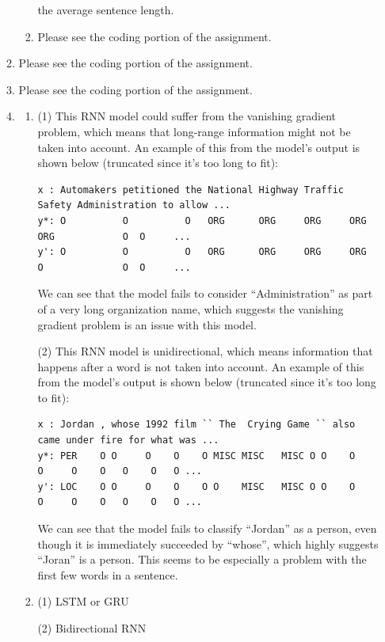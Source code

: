 \documentclass[10pt,reqno]{amsart}
\begin{document}
\begin{enumerate}[topsep=0pt,itemsep=3ex,partopsep=1ex,parsep=1ex]
\begin{enumerate}[itemsep=2ex]
\begin{enumerate}[itemsep=2ex]
        the average sentence length. 
      \item Please see the coding portion of the assignment.
    \end{enumerate}
  \item Please see the coding portion of the assignment.
  \item Please see the coding portion of the assignment.
  \item 
    \begin{enumerate}[itemsep=2ex]
      \item 
        (1) This RNN model could suffer from the vanishing gradient problem, which means that long-range information 
        might not be taken into account. An example of this from the model's output is shown below
        (truncated since it's too long to fit):
        \begin{verbatim}
x : Automakers petitioned the National Highway Traffic Safety Administration to allow ...
y*: O          O          O   ORG      ORG     ORG     ORG    ORG            O  O     ...
y': O          O          O   ORG      ORG     ORG     ORG    O              O  O     ...
        \end{verbatim}
        We can see that the model fails to consider ``Administration'' as part of a very long organization name, 
        which suggests the vanishing gradient problem is an issue with this model.
        
        (2) This RNN model is unidirectional, which means information that happens after a word is not 
        taken into account. An example of this from the model's output is shown below
        (truncated since it's too long to fit):
        \begin{verbatim}
x : Jordan , whose 1992 film `` The  Crying Game `` also came under fire for what was ...
y*: PER    O O     O    O    O MISC MISC   MISC O O    O    O     O    O   O    O   O ...
y': LOC    O O     O    O    O O    MISC   MISC O O    O    O     O    O   O    O   O ...
        \end{verbatim}
        We can see that the model fails to classify ``Jordan'' as a person, even though it is immediately 
        succeeded by ``whose'', which highly suggests ``Joran'' is a person. This seems to be especially a 
        problem with the first few words in a sentence. 
      \item
        (1) LSTM or GRU

        (2) Bidirectional RNN
    \end{enumerate}
  \end{enumerate}



\end{enumerate}
\end{document}
